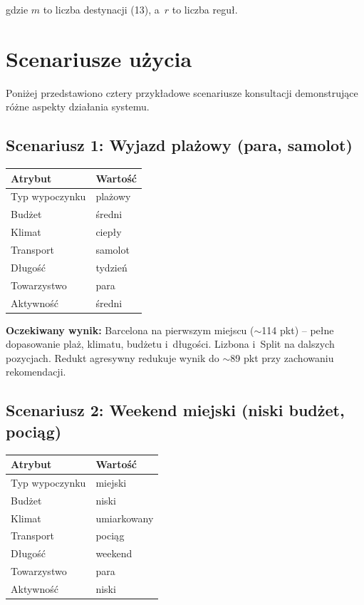 \documentclass[12pt,a4paper]{article}
\begin{document}
gdzie $m$ to liczba destynacji (13), a~$r$ to liczba reguł.

\section{Scenariusze użycia}

Poniżej przedstawiono cztery przykładowe scenariusze konsultacji demonstrujące różne aspekty działania systemu.

\subsection{Scenariusz 1: Wyjazd plażowy (para, samolot)}

\begin{table}[H]
\centering
\begin{tabular}{ll}
\toprule
\textbf{Atrybut} & \textbf{Wartość} \\
\midrule
Typ wypoczynku & plażowy \\
Budżet & średni \\
Klimat & ciepły \\
Transport & samolot \\
Długość & tydzień \\
Towarzystwo & para \\
Aktywność & średni \\
\bottomrule
\end{tabular}
\end{table}

\textbf{Oczekiwany wynik:} Barcelona na pierwszym miejscu ($\sim$114 pkt) -- pełne dopasowanie plaż, klimatu, budżetu i~długości. Lizbona i~Split na dalszych pozycjach. Redukt agresywny redukuje wynik do $\sim$89 pkt przy zachowaniu rekomendacji.

\subsection{Scenariusz 2: Weekend miejski (niski budżet, pociąg)}

\begin{table}[H]
\centering
\begin{tabular}{ll}
\toprule
\textbf{Atrybut} & \textbf{Wartość} \\
\midrule
Typ wypoczynku & miejski \\
Budżet & niski \\
Klimat & umiarkowany \\
Transport & pociąg \\
Długość & weekend \\
Towarzystwo & para \\
Aktywność & niski \\
\bottomrule
\end{tabular}
\end{table}
\end{document}
